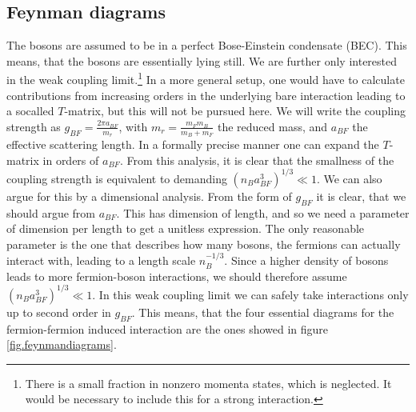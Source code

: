 \subsection{Feynman diagrams} \label{subsec.Feynmandiagrams}
The bosons are assumed to be in a perfect Bose-Einstein condensate (BEC). This means, that the bosons are essentially lying still. We are further only interested in the weak coupling limit.\footnote{There is a small fraction in nonzero momenta states, which is neglected. It would be necessary to include this for a strong interaction.} In a more general setup, one would have to calculate contributions from increasing orders in the underlying bare interaction leading to a socalled $T$-matrix, but this will not be pursued here. We will write the coupling strength as $g_{BF} = \frac{2\pi a_{BF}}{m_r}$, with $m_r = \frac{m_Fm_B}{m_B + m_F}$ the reduced mass, and $a_{BF}$ the effective scattering length. In a formally precise manner one can expand the $T$-matrix in orders of $a_{BF}$. From this analysis, it is clear that the smallness of the coupling strength is equivalent to demanding $(n_Ba_{BF}^3)^{1/3}\ll 1$. We can also argue for this by a dimensional analysis. From the form of $g_{BF}$ it is clear, that we should argue from $a_{BF}$. This has dimension of length, and so we need a parameter of dimension per length to get a unitless expression. The only reasonable parameter is the one that describes how many bosons, the fermions can actually interact with, leading to a length scale $n_B^{-1/3}$. Since a higher density of bosons leads to more fermion-boson interactions, we should therefore assume $(n_Ba_{BF}^3)^{1/3} \ll 1$. In this weak coupling limit we can safely take interactions only up to second order in $g_{BF}$. This means, that the four essential diagrams for the fermion-fermion induced interaction are the ones showed in figure \ref{fig.feynmandiagrams}. 

